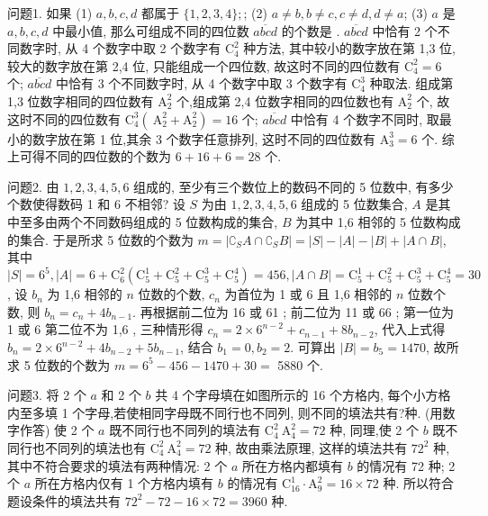 
问题1. 如果 (1) $a, b, c, d$ 都属于 $\{1,2,3,4\} ;$; (2) $a \neq b, b \neq c, c \neq d, d \neq a$; (3) $a$ 是 $a, b, c, d$ 中最小值, 那么可组成不同的四位数 $\overline{a b c d}$ 的个数是 . 
$\overline{a b c d}$ 中恰有 2 个不同数字时, 从 4 个数字中取 2 个数字有 $\mathrm{C}_4^2$ 种方法, 其中较小的数字放在第 1,3 位, 较大的数字放在第 2,4 位, 只能组成一个四位数, 故这时不同的四位数有 $\mathrm{C}_4^2=6$ 个; $\overline{a b c d}$ 中恰有 3 个不同数字时, 从 4 个数字中取 3 个数字有 $\mathrm{C}_4^3$ 种取法.
组成第 1,3 位数字相同的四位数有 $\mathrm{A}_2^2$ 个,组成第 2,4 位数字相同的四位数也有 $\mathrm{A}_2^2$ 个, 故这时不同的四位数有 $\mathrm{C}_4^3\left(\mathrm{~A}_2^2+\mathrm{A}_2^2\right)=16$ 个; $\overline{a b c d}$ 中恰有 4 个数字不同时, 取最小的数字放在第 1 位,其余 3 个数字任意排列, 这时不同的四位数有 $\mathrm{A}_3^3=6$ 个.
综上可得不同的四位数的个数为 $6+16+6=28$ 个.



问题2. 由 $1,2,3,4,5,6$ 组成的, 至少有三个数位上的数码不同的 5 位数中, 有多少个数使得数码 1 和 6 不相邻?
设 $S$ 为由 $1,2,3,4,5,6$ 组成的 5 位数集合, $A$ 是其中至多由两个不同数码组成的 5 位数构成的集合, $B$ 为其中 1,6 相邻的 5 位数构成的集合.
于是所求 5 位数的个数为 $m=\left|\complement_S A \cap \complement_S B\right|=|S|-|A|-|B|+|A \cap B|$, 其中 $|S|=6^5,|A|=6+\mathrm{C}_6^2\left(\mathrm{C}_5^1+\mathrm{C}_5^2+\mathrm{C}_5^3+\mathrm{C}_5^4\right)=456,|A \cap B|=\mathrm{C}_5^1+ \mathrm{C}_5^2+\mathrm{C}_5^3+\mathrm{C}_5^4=30$, 设 $b_n$ 为 1,6 相邻的 $n$ 位数的个数, $c_n$ 为首位为 1 或 6 且 1,6 相邻的 $n$ 位数个数, 则 $b_n=c_n+4 b_{n-1}$. 再根据前二位为 16 或 61 ; 前二位为 11 或 66 ; 第一位为 1 或 6 第二位不为 1,6 , 三种情形得 $c_n=2 \times 6^{n-2}+ c_{n-1}+8 b_{n-2}$, 代入上式得 $b_n=2 \times 6^{n-2}+4 b_{n-2}+5 b_{n-1}$, 结合 $b_1=0, b_2=2$. 可算出 $|B|=b_5=1470$, 故所求 5 位数的个数为 $m=6^5-456-1470+30=$ 5880 个.



问题3. 将 2 个 $a$ 和 2 个 $b$ 共 4 个字母填在如图所示的 16 个方格内, 每个小方格内至多填 1 个字母,若使相同字母既不同行也不同列, 则不同的填法共有?种.
(用数字作答) 
使 2 个 $a$ 既不同行也不同列的填法有 $\mathrm{C}_4^2 \mathrm{~A}_4^2=72$ 种, 同理,使 2 个 $b$ 既不同行也不同列的填法也有 $\mathrm{C}_4^2 \mathrm{~A}_4^2=72$ 种, 故由乘法原理, 这样的填法共有 $72^2$ 种, 其中不符合要求的填法有两种情况: 2 个 $a$ 所在方格内都填有 $b$ 的情况有 72 种; 2 个 $a$ 所在方格内仅有 1 个方格内填有 $b$ 的情况有 $\mathrm{C}_{16}^1 \cdot \mathrm{A}_9^2=16 \times 72$ 种.
所以符合题设条件的填法共有 $72^2-72-16 \times 72=3960$ 种.



